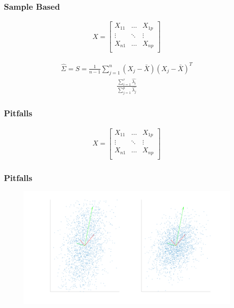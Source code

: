 \documentclass[aspectratio=169,10pt,t]{beamer}
\begin{document}
\begin{frame}[t]
    \frametitle{Sample Based}

    \begin{align*}
    X = \begin{bmatrix}
			X_{11} & \hdots & X_{1p} \\
        \vdots &  \ddots & \vdots  \\
				X_{n1} & \hdots & X_{np} \\
    \end{bmatrix}
    \end{align*}

    \begin{align*}
        \hat{\Sigma} = S = \frac{1}{n-1} \sum^{n}_{j=1} (X_j - \bar{X} )(X_j - \bar{X} )^T
    \end{align*}
   \begin{align*}
    \frac{ \sum^{r}_{i=1} \hat{\lambda_i}  }{ \sum^{p}_{j=1} \hat{\lambda_j}  }
   \end{align*}
    

    
\end{frame}

\begin{frame}[t]
    \frametitle{Pitfalls}

    \begin{align*}
    X = \begin{bmatrix}
			X_{11} & \hdots & X_{1p} \\
        \vdots &  \ddots & \vdots  \\
				X_{n1} & \hdots & X_{np} \\
    \end{bmatrix}
    \end{align*}

    
\end{frame}

\begin{frame}[t]
    \frametitle{Pitfalls}

    \begin{figure}[H]
        \centering
        \includegraphics[width=0.8\linewidth]{images/compare.png}
    \end{figure}
    
\end{frame}
\end{document}
